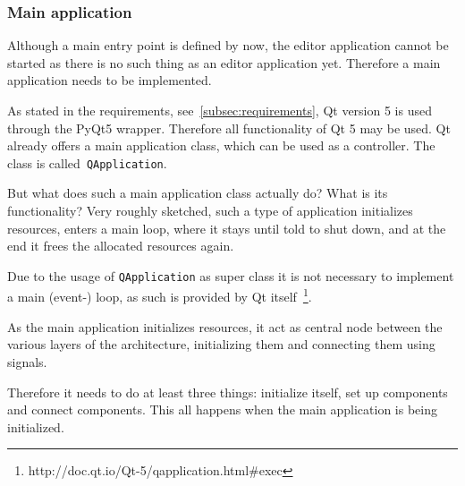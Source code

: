 \documentclass[
    a4paper,      %
    10pt,         %
    openright,    %
    notitlepage,  %
    parskip=half, %
]{scrreprt}       %
\theoremstyle{definition}                    %
\begin{document}
\subsubsection{Main application}
\label{ssubsec:main-application}

Although a main entry point is defined by now, the editor application cannot be
started as there is no such thing as an editor application yet. Therefore a main
application needs to be implemented.

As stated in the requirements, see~\autoref{subsec:requirements}, Qt version 5
is used through the PyQt5 wrapper. Therefore all functionality of Qt 5 may be
used. Qt already offers a main application class, which can be used as a
controller. The class is called~\verb+QApplication+.

But what does such a main application class actually do? What is its
functionality? Very roughly sketched, such a type of application initializes
resources, enters a main loop, where it stays until told to shut down, and at
the end it frees the allocated resources again.

Due to the usage of \verb+QApplication+ as super class it is not necessary to
implement a main (event-) loop, as such is provided by Qt
itself~\footnote{http://doc.qt.io/Qt-5/qapplication.html\#exec}.

As the main application initializes resources, it act as central node between the
various layers of the architecture, initializing them and connecting them using
signals.\cite[pp. 37 --- 38]{osterwalder_qde_2016}

Therefore it needs to do at least three things: initialize itself, set up
components and connect components. This all happens when the main application is
being initialized.
\end{document}
